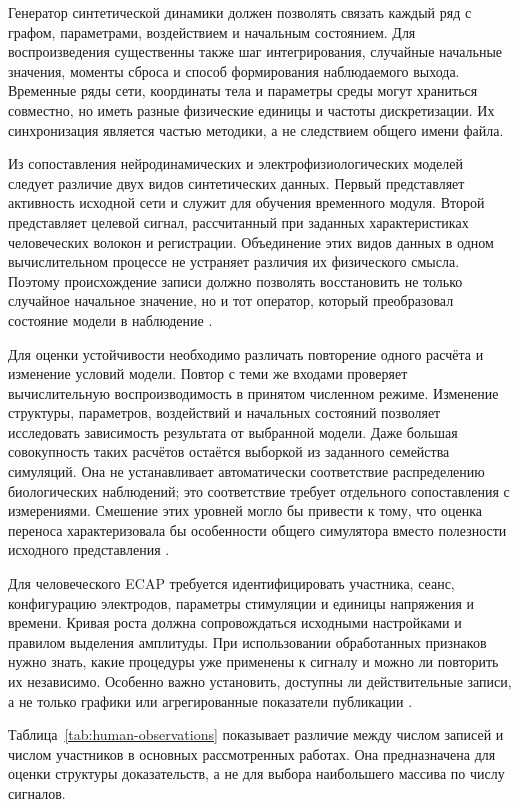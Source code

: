 Генератор синтетической динамики должен позволять связать каждый ряд с графом, параметрами, воздействием и начальным состоянием. Для воспроизведения существенны также шаг интегрирования, случайные начальные значения, моменты сброса и способ формирования наблюдаемого выхода. Временные ряды сети, координаты тела и параметры среды могут храниться совместно, но иметь разные физические единицы и частоты дискретизации. Их синхронизация является частью методики, а не следствием общего имени файла.

Из сопоставления нейродинамических и электрофизиологических моделей следует различие двух видов синтетических данных. Первый представляет активность исходной сети и служит для обучения временного модуля. Второй представляет целевой сигнал, рассчитанный при заданных характеристиках человеческих волокон и регистрации. Объединение этих видов данных в одном вычислительном процессе не устраняет различия их физического смысла. Поэтому происхождение записи должно позволять восстановить не только случайное начальное значение, но и тот оператор, который преобразовал состояние модели в наблюдение \cite{s285,ecapmodel,s746}.

Для оценки устойчивости необходимо различать повторение одного расчёта и изменение условий модели. Повтор с теми же входами проверяет вычислительную воспроизводимость в принятом численном режиме. Изменение структуры, параметров, воздействий и начальных состояний позволяет исследовать зависимость результата от выбранной модели. Даже большая совокупность таких расчётов остаётся выборкой из заданного семейства симуляций. Она не устанавливает автоматически соответствие распределению биологических наблюдений; это соответствие требует отдельного сопоставления с измерениями. Смешение этих уровней могло бы привести к тому, что оценка переноса характеризовала бы особенности общего симулятора вместо полезности исходного представления \cite{s743,s836}.

Для человеческого ECAP требуется идентифицировать участника, сеанс, конфигурацию электродов, параметры стимуляции и единицы напряжения и времени. Кривая роста должна сопровождаться исходными настройками и правилом выделения амплитуды. При использовании обработанных признаков нужно знать, какие процедуры уже применены к сигналу и можно ли повторить их независимо. Особенно важно установить, доступны ли действительные записи, а не только графики или агрегированные показатели публикации \cite{posture,s105}.

Таблица~\ref{tab:human-observations} показывает различие между числом записей и числом участников в основных рассмотренных работах. Она предназначена для оценки структуры доказательств, а не для выбора наибольшего массива по числу сигналов.

